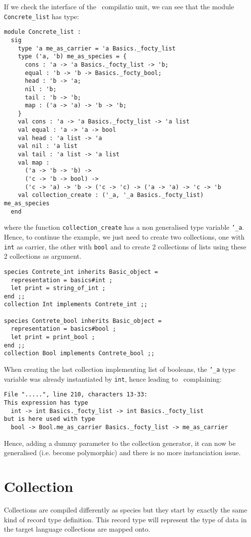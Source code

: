 If we check the interface of the \ocaml\ compilatio unit, we can see
that the module {\tt Concrete\_list} has type:
{\footnotesize
\begin{lstlisting}[language=MyOCaml]
module Concrete_list :
  sig
    type 'a me_as_carrier = 'a Basics._focty_list
    type ('a, 'b) me_as_species = {
      cons : 'a -> 'a Basics._focty_list -> 'b;
      equal : 'b -> 'b -> Basics._focty_bool;
      head : 'b -> 'a;
      nil : 'b;
      tail : 'b -> 'b;
      map : ('a -> 'a) -> 'b -> 'b;
    }
    val cons : 'a -> 'a Basics._focty_list -> 'a list
    val equal : 'a -> 'a -> bool
    val head : 'a list -> 'a
    val nil : 'a list
    val tail : 'a list -> 'a list
    val map :
      ('a -> 'b -> 'b) ->
      ('c -> 'b -> bool) ->
      ('c -> 'a) -> 'b -> ('c -> 'c) -> ('a -> 'a) -> 'c -> 'b
    val collection_create : ('_a, '_a Basics._focty_list) me_as_species
  end
\end{lstlisting}
}
where the function {\tt collection\_create} has a non generalised type
variable {\tt '\_a}. Hence, to continue the example, we just need to
create two collections, one with {\tt int} as carrier, the other with
{\tt bool} and to create 2 collections of lists using these 2 collections
as argument.
{\footnotesize
\begin{lstlisting}
species Contrete_int inherits Basic_object =
  representation = basics#int ;
  let print = string_of_int ;
end ;;
collection Int implements Contrete_int ;;

species Contrete_bool inherits Basic_object =
  representation = basics#bool ;
  let print = print_bool ;
end ;;
collection Bool implements Contrete_bool ;;
\end{lstlisting}
}
When creating the last collection implementing list of booleans, the
{\tt '\_a} type variable was already instantiated by {\tt int}, hence
leading to \ocaml\ complaining:
\begin{verbatim}
File ".....", line 210, characters 13-33:
This expression has type
  int -> int Basics._focty_list -> int Basics._focty_list
but is here used with type
  bool -> Bool.me_as_carrier Basics._focty_list -> me_as_carrier
\end{verbatim}

Hence, adding a dummy parameter to the collection generator, it can
now be generalised (i.e. become polymorphic) and there is no more
instanciation issue.

\section{Collection}
Collections are compiled differently as species but they start by
exactly the same kind of record type definition. This record type will
represent the type of data in the target language collections are
mapped onto.

